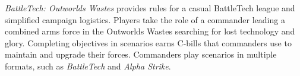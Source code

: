 \emph{BattleTech: Outworlds Wastes} provides rules for a casual BattleTech league and simplified campaign logistics.
Players take the role of a commander leading a combined arms force in the Outworlds Wastes searching for lost technology and glory.
Completing objectives in scenarios earns C-bills that commanders use to maintain and upgrade their forces.
Commanders play scenarios in multiple formats, such as \emph{BattleTech} and \emph{Alpha Strike}.
